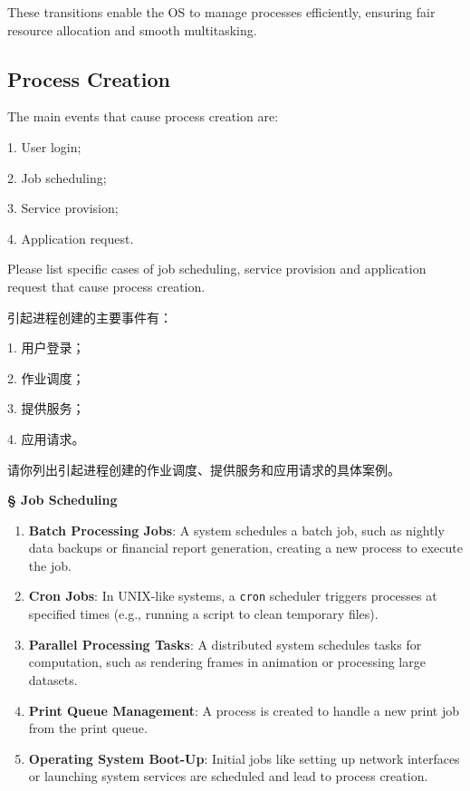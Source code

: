 \documentclass[a4paper]{book}
\newcommand{\sfbf}[1]{{\normalsize\textsf{\textbf{§ #1}}}}
\begin{document}
These transitions enable the OS to manage processes efficiently, ensuring fair resource allocation and smooth multitasking.

\subsection{Process Creation}

\begin{greenbox}
The main events that cause process creation are:

1. User login;

2. Job scheduling;

3. Service provision;

4. Application request.

Please list specific cases of job scheduling, service provision and application request that cause process creation.
\end{greenbox}

引起进程创建的主要事件有：

1. 用户登录；

2. 作业调度；

3. 提供服务；

4. 应用请求。

请你列出引起进程创建的作业调度、提供服务和应用请求的具体案例。

\sfbf{Job Scheduling}

\begin{enumerate}
\item 
\textbf{Batch Processing Jobs}: A system schedules a batch job, such as nightly data backups or financial report generation, creating a new process to execute the job.

\item 
\textbf{Cron Jobs}: In UNIX-like systems, a \verb|cron| scheduler triggers processes at specified times (e.g., running a script to clean temporary files).

\item 
\textbf{Parallel Processing Tasks}: A distributed system schedules tasks for computation, such as rendering frames in animation or processing large datasets.

\item 
\textbf{Print Queue Management}: A process is created to handle a new print job from the print queue.

\item 
\textbf{Operating System Boot-Up}: Initial jobs like setting up network interfaces or launching system services are scheduled and lead to process creation.

\end{enumerate}
\end{document}
